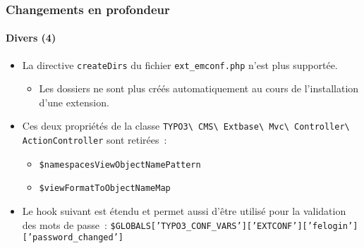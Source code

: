 
\begin{frame}[fragile]
	\frametitle{Changements en profondeur}
	\framesubtitle{Divers (4)}

	\begin{itemize}
		\item La directive \texttt{createDirs} du fichier \texttt{ext\_emconf.php} n'est plus supportée.

			\begin{itemize}\smaller
				\item[\ding{228}] Les dossiers ne sont plus créés automatiquement au cours de l'installation d'une extension.
			\end{itemize}\normalsize

		\item Ces deux propriétés de la classe
			\texttt{TYPO3\textbackslash
				CMS\textbackslash
				Extbase\textbackslash
				Mvc\textbackslash
				Controller\textbackslash
				ActionController}\newline
			sont retirées~:

			\begin{itemize}
				\item \texttt{\$namespacesViewObjectNamePattern}
				\item \texttt{\$viewFormatToObjectNameMap}
			\end{itemize}

		\item Le hook suivant est étendu et permet aussi d'être utilisé pour la validation des mots de passe~:\newline
			{\fontsize{8}{10} \selectfont \texttt{\$GLOBALS['TYPO3\_CONF\_VARS']['EXTCONF']['felogin']['password\_changed']}}

	\end{itemize}

\end{frame}


